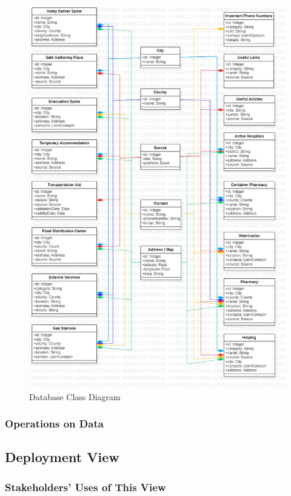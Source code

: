 \begin{figure}[H]
  \centering
  \includegraphics[width=\linewidth]{img/database-class-diagram.jpg}
  \caption{Database Class Diagram}
\end{figure}

\subsubsection{Operations on Data}

\subsection{Deployment View}

\subsubsection{Stakeholders' Uses of This View}

